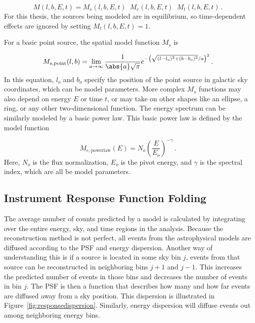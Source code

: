   \begin{equation}\label{eqn:modelparts}
    M(l,b,E,t) = M_s(l,b,E,t) \; \; M_e(l,b,E,t) \; \; M_t(l,b,E,t) \,.
  \end{equation}
  For this thesis, the sources being modeled are in equilibrium, so time-dependent effects are ignored by setting $M_{t}(l,b,E,t) = 1$.

  For a basic point source, the spatial model function $M_s$ is

  \begin{equation}\label{eqn:pntsrc_Ms}
    M_{s,\textrm{point}}(l,b) = \lim_{a\to\infty} \frac{1}{ \abs{a} \sqrt{\pi} } e^{ - \left ( \sqrt{ (l-l_o)^2 + (b-b_o)^2 }/a \right )^2 } \,.
  \end{equation}
  In this equation, $l_o$ and $b_o$ specify the position of the point source in galactic sky coordinates, which can be model parameters.
  More complex $M_s$ functions may also depend on energy $E$ or time $t$, or may take on other shapes like an ellipse, a ring, or any other two-dimensional function.
  The energy spectrum can be similarly modeled by a basic power law.
  This basic power law is defined by the model function
  
  \begin{equation}\label{eqn:powerlaw_Me}
    M_{e,\textrm{powerlaw}}(E) = N_o \left ( \frac{E}{E_o} \right )^{-\gamma} \,.
  \end{equation}
  Here, $N_o$ is the flux normalization, $E_o$ is the pivot energy, and $\gamma$ is the spectral index, which are all be model parameters.

  
  \subsection{Instrument Response Function Folding}\label{subsec:folding}
  The average number of counts predicted by a model is calculated by integrating over the entire energy, sky, and time regions in the analysis.
  Because the reconstruction method is not perfect, all events from the astrophysical models are diffused according to the PSF and energy dispersion.
  Another way of understanding this is if a source is located in some sky bin $j$, events from that source can be reconstructed in neighboring bins $j+1$ and $j-1$.
  This increases the predicted number of events in those bins and decreases the number of events in bin $j$.
  The PSF is then a function that describes how many and how far events are diffused away from a sky position.
  This dispersion is illustrated in Figure~\ref{fig:responsedispersion}.
  Similarly, energy dispersion will diffuse events out among neighboring energy bins.
  

